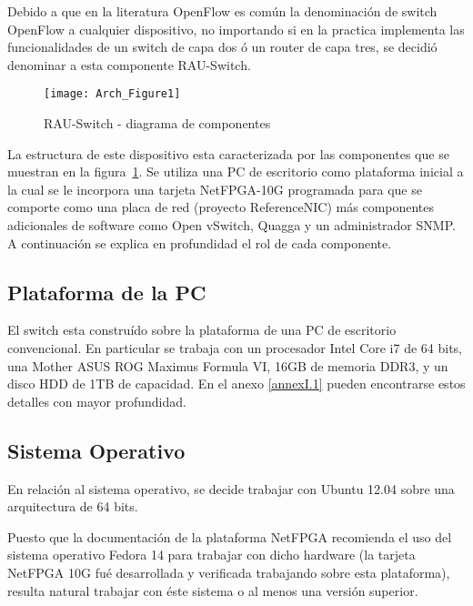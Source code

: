 Debido a que en la literatura OpenFlow es común la denominación de switch OpenFlow a cualquier dispositivo, no importando si en la practica implementa las funcionalidades de un switch de capa dos \'o un router de capa tres, se decidió denominar a esta componente RAU-Switch.\\

\begin{figure}[h] 
\centering    
\texttt{[image: Arch\_Figure1]}
\caption[RAU-Switch - diagrama de componentes]{RAU-Switch - diagrama de componentes}
\label{fig:OpenSourceRArch}
\end{figure}

La estructura de este dispositivo esta caracterizada por las componentes que se muestran en la figura~\ref{fig:OpenSourceRArch}. Se utiliza una PC de escritorio como plataforma inicial a la cual se le incorpora una tarjeta NetFPGA-10G programada para que se comporte como una placa de red (proyecto ReferenceNIC) m\'as componentes adicionales de software como Open vSwitch, Quagga y un administrador SNMP. A continuaci\'on se explica en profundidad el rol de cada componente.

\subsection{Plataforma de la PC}
El switch esta constru\'ido sobre la plataforma de una PC de escritorio convencional. En particular se trabaja con un procesador Intel Core i7 de 64 bits, una Mother ASUS ROG Maximus Formula VI, 16GB de memoria DDR3, y un disco HDD de 1TB de capacidad. En el anexo \ref{annexI.1} pueden encontrarse estos detalles con mayor profundidad.

\subsection{Sistema Operativo}
En relación al sistema operativo, se decide trabajar con Ubuntu 12.04 sobre una arquitectura de 64 bits. %

Puesto que la documentaci\'on de la plataforma NetFPGA recomienda el uso del sistema operativo Fedora 14 para trabajar con dicho hardware (la tarjeta NetFPGA 10G fu\'e desarrollada y verificada trabajando sobre esta plataforma), resulta natural trabajar con \'este sistema o al menos una versi\'on superior.\\


